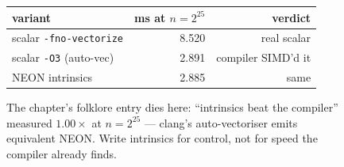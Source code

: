 \begin{figure}[htbp]
\centering
\begin{tabular}{lrr}
\toprule
variant & ms at $n=2^{25}$ & verdict \\
\midrule
scalar \texttt{-fno-vectorize} & 8.520 & real scalar \\
scalar \texttt{-O3} (auto-vec) & 2.891 & compiler SIMD'd it \\
NEON intrinsics & 2.885 & same \\
\bottomrule
\end{tabular}
\caption{The chapter's folklore entry dies here: ``intrinsics beat
the compiler'' measured $1.00\times$ at $n=2^{25}$ --- clang's
auto-vectoriser emits equivalent NEON. Write intrinsics for
control, not for speed the compiler already finds.}
\label{fig:autovec16}
\end{figure}

